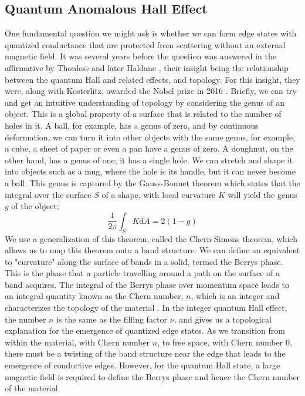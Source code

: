 \subsection{Quantum Anomalous Hall Effect}
One fundamental question we might ask is whether we can form edge states with quantized conductance that are protected from
scattering without an external magnetic field. It was several years before the question was answered in the affirmative by
Thouless \cite{PhysRevLett.49.405} and later Haldane \cite{PhysRevLett.61.2015}, their insight being the relationship between the
quantum Hall and related effects, and topology. For this insight, they were, along with Kosterlitz, awarded the Nobel prize in 2016 \cite{nobel2016}.
Briefly, we can try and get an intuitive understanding of topology by considering the genus of an object. This is a global property of
a surface that is related to the number of holes in it. A ball, for example, has a genus of zero, and by continuous deformation, we can turn it
into other objects with the same genus, for example, a cube, a sheet of paper or even a pan have a genus of zero. A doughnut, on the other hand, has
a genus of one; it has a single hole. We can stretch and shape it into objects such as a mug, where the hole is its handle, but it can never become a ball.
This genus is captured by the Gauss-Bonnet theorem which states that the integral over the surface $S$ of a shape, with local curvature $K$ will yield
the genus $g$ of the object:
\begin{equation}
  \frac{1}{2\pi}\int_S K \mathrm{d}A = 2(1-g)
\end{equation}
We use a generalization of this theorem, called the Chern-Simons theorem, which allows us to map this theorem onto a band structure. We can define an
equivalent to "curvature" along the surface of bands in a solid, termed the Berrys phase. This is the phase that a particle travelling around
a path on the surface of a band acquires. The integral of the Berrys phase over momentum space leads to an integral quantity known as the Chern number,
$n$, which is an integer and characterizes the topology of the material \cite{conmatphys-011417}. In the integer quantum Hall effect, the number $n$ is the same as the filling factor $\nu$, and gives us a topological explanation for the emergence of quantized edge states. As we transition from within
the material, with Chern number $n$, to free space, with Chern number $0$, there must be a twisting of the band structure near the edge that leads to the emergence of conductive edges. However, for the quantum Hall state, a large magnetic field is required to define the Berrys phase and hence the Chern number of the material.

